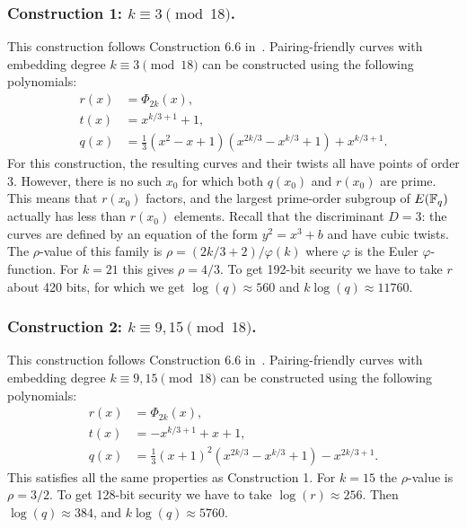 \subsubsection{Construction 1: $k \equiv 3 \pmod{18}$.}
\label{con1}

This construction follows {Construction 6.6} in~\cite{2010/freeman}.
Pairing-friendly curves with embedding degree $k \equiv 3 \pmod{18}$
can be constructed using the following polynomials:
\begin{align*}
r(x) &= \Phi_{2k}(x),	\\
t(x) &= x^{k/3+1} + 1,	\\
q(x) &= \tfrac{1}{3} (x^2 - x + 1) (x^{2k/3} - x^{k/3} + 1) + x^{k/3+1}.
\end{align*}
For this construction,
the resulting curves and their twists all have points of order 3.
However, there is no such $x_0$ for which
both $q(x_0)$ and $r(x_0)$ are prime.
This means that $r(x_0)$ factors, and the largest prime-order subgroup of $E(\mathbb{F}_{q})$ actually has less than $r(x_0)$ elements.
Recall that the discriminant $D = 3$: the curves are defined by an equation of the form $y^2 = x^3 + b$ and have cubic twists.
The $\rho$-value of this family is $\rho = (2k/3 + 2)/\varphi(k)$ where $\varphi$ is the Euler $\varphi$-function.
For $k = 21$ this gives $\rho = 4/3$.
To get 192-bit security we have to take $r$ about 420 bits, 
for which we get $\log(q) \approx 560 $ and
$k\log (q) \approx 11760$.


\subsubsection{Construction 2: $k \equiv 9,15 \pmod{18}$.}
\label{con2}

This construction follows {Construction 6.6} in~\cite{2010/freeman}.
Pairing-friendly curves with embedding degree $k \equiv 9,15 \pmod{18}$
can be constructed using the following polynomials:
\begin{align*}
r(x) &= \Phi_{2k}(x),		\\
t(x) &= -x^{k/3+1} + x + 1,	\\
q(x) &= \tfrac{1}{3} (x+1)^2 (x^{2k/3} - x^{k/3} + 1) - x^{2k/3+1}.
\end{align*}
This satisfies all the same properties as Construction 1.
For $k=15$ the $\rho$-value is $\rho=3/2$.
To get 128-bit security we have to take
$\log(r) \approx 256$. Then
$\log(q) \approx 384$, and $k\log(q) \approx 5760$.

